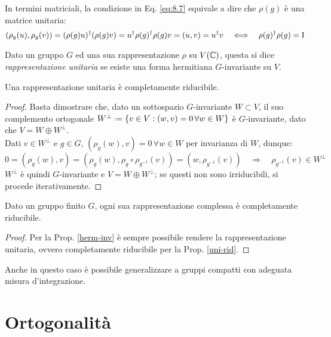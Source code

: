In termini matriciali, la condizione in Eq. \ref{eq:8.7} equivale a dire che $ \rho(g) $ è una matrice unitaria:
\begin{equation*}
	(\rho_g(u),\rho_g(v)) = (\rho(g) u)^{\dagger} (\rho(g) v) = u^{\dagger} \rho(g)^{\dagger} \rho(g) v = (u,v) = u^{\dagger} v \quad\Longleftrightarrow\quad \rho(g)^{\dagger} \rho(g) = \mathrm{I}
\end{equation*}

\begin{definition}
	Dato un gruppo $ G $ ed una sua rappresentazione $ \rho $ su $ V(\mathbb{C}) $, questa si dice \textit{rappresentazione unitaria} se esiste una forma hermitiana $ G $-invariante su $ V $.
\end{definition}

\begin{proposition}\label{uni-rid}
	Una rappresentazione unitaria è completamente riducibile.
\end{proposition}
\begin{proof}
	Basta dimostrare che, dato un sottospazio $ G $-invariante $ W \subset V $, il suo complemento ortogonale $ W^{\perp} \defeq \{v \in V : (w,v) = 0 \,\forall w \in W\} $ è $ G $-invariante, dato che $ V = W \oplus W^{\perp} $.\\
	Dati $ v \in W^{\perp} $ e $ g \in G $, $ (\rho_g(w),v) = 0 \,\forall w \in W $ per invarianza di $ W $, dunque:
	\begin{equation*}
		0 = (\rho_g(w),v) = (\rho_g(w),\rho_g \circ \rho_{g^{-1}}(v)) = (w,\rho_{g^{-1}}(v)) \quad\Rightarrow\quad \rho_{g^{-1}}(v) \in W^{\perp}
	\end{equation*}
	$ W^{\perp} $ è quindi $ G $-invariante e $ V = W \oplus W^{\perp} $; se questi non sono irriducibili, si procede iterativamente.
\end{proof}

\begin{theorem}[Maschke]
	Dato un gruppo finito $ G $, ogni sua rappresentazione complessa è completamente riducibile.
\end{theorem}
\begin{proof}
	Per la Prop. \ref{herm-inv} è sempre possibile rendere la rappresentazione unitaria, ovvero completamente riducibile per la Prop. \ref{uni-rid}.
\end{proof}

Anche in questo caso è possibile generalizzare a gruppi compatti con adeguata misura d'integrazione.

\section{Ortogonalità}

